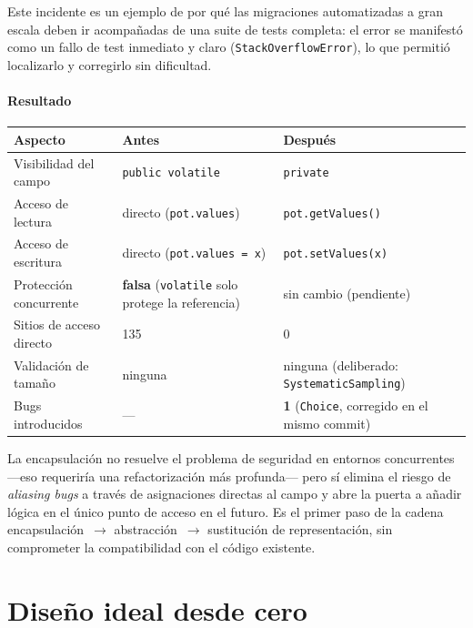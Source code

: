 \documentclass[11pt,a4paper]{article}
\newcommand{\code}[1]{\texttt{#1}}
\newcommand{\bad}[1]{\textcolor{codered}{\textbf{#1}}}
\newcommand{\warn}[1]{\textcolor{warnorange}{\textbf{#1}}}
\begin{document}
Este incidente es un ejemplo de por qué las migraciones automatizadas
a gran escala deben ir acompañadas de una suite de tests completa: el
error se manifestó como un fallo de test inmediato y claro
(\code{StackOverflowError}), lo que permitió localizarlo y corregirlo
sin dificultad.

\subsection{Resultado}

\begin{center}
\begin{tabular}{lll}
\toprule
\textbf{Aspecto} & \textbf{Antes} & \textbf{Después} \\
\midrule
Visibilidad del campo   & \code{public volatile} & \code{private} \\
Acceso de lectura       & directo (\code{pot.values})   & \code{pot.getValues()} \\
Acceso de escritura     & directo (\code{pot.values = x}) & \code{pot.setValues(x)} \\
Protección concurrente  & \bad{falsa} (\code{volatile} solo protege la referencia) & sin cambio (pendiente) \\
Sitios de acceso directo & 135 & 0 \\
Validación de tamaño    & ninguna & ninguna (deliberado: \code{SystematicSampling}) \\
Bugs introducidos       & --- & \warn{1} (\code{Choice}, corregido en el mismo commit) \\
\bottomrule
\end{tabular}
\end{center}

La encapsulación no resuelve el problema de seguridad en entornos
concurrentes ---eso requeriría una refactorización más profunda--- pero
sí elimina el riesgo de \emph{aliasing bugs} a través de asignaciones
directas al campo y abre la puerta a añadir lógica en el único punto
de acceso en el futuro.  Es el primer paso de la cadena
encapsulación~$\to$ abstracción~$\to$ sustitución de representación,
sin comprometer la compatibilidad con el código existente.

\newpage
\part{Diseño ideal desde cero}
\label{part:diseno-ideal}
\end{document}
